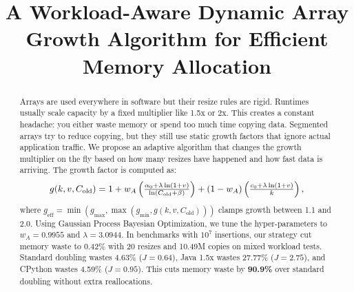 \documentclass[conference]{IEEEtran}
\begin{document}
\title{A Workload-Aware Dynamic Array Growth Algorithm for Efficient Memory Allocation}

\author{
\and
{}
\and
{}
}

\maketitle

\begin{abstract}
Arrays are used everywhere in software but their resize rules are rigid. Runtimes usually scale capacity by a fixed multiplier like 1.5x or 2x. This creates a constant headache: you either waste memory or spend too much time copying data. Segmented arrays try to reduce copying, but they still use static growth factors that ignore actual application traffic. We propose an adaptive algorithm that changes the growth multiplier on the fly based on how many resizes have happened and how fast data is arriving. The growth factor is computed as:
\[
\scalebox{0.95}{$g(k,v,C_{\text{old}}) = 1 + w_A \left( \frac{\alpha_0 + \lambda \ln(1+v)}{\ln(C_{\text{old}} + \beta)} \right) + (1 - w_A) \left( \frac{c_0 + \lambda \ln(1+v)}{k} \right),$}
\]
where $g_{\text{eff}} = \min(g_{\max}, \max(g_{\min}, g(k,v,C_{\text{old}})))$ clamps growth between 1.1 and 2.0. Using Gaussian Process Bayesian Optimization, we tune the hyper-parameters to $w_A = 0.9955$ and $\lambda = 3.0944$. In benchmarks with $10^7$ insertions, our strategy cut memory waste to 0.42\% with 20 resizes and 10.49M copies on mixed workload tests. Standard doubling wastes 4.63\% ($J=0.64$), Java 1.5x wastes 27.77\% ($J=2.75$), and CPython wastes 4.59\% ($J=0.95$). This cuts memory waste by \textbf{90.9\%} over standard doubling without extra reallocations.
\end{abstract}
\end{document}
